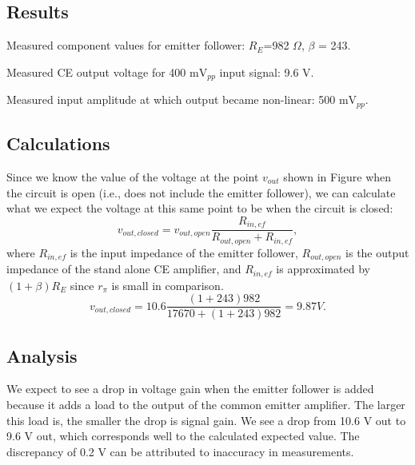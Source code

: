 \documentclass[12pt,letterpaper]{report}
\begin{document}

\subsection*{Results}

Measured component values for emitter follower:
$R_{E}$=982 $\Omega$,
$\beta$ = 243.

Measured CE output voltage for 400 m$\text{V}_{pp}$ input signal: 9.6 V.

Measured input amplitude at which output became non-linear: 500 m$\text{V}_{pp}$.

\subsection*{Calculations}

Since we know the value of the voltage at the point $v_{out}$ shown in Figure %
when the circuit is open (i.e., does not include the emitter follower), we can calculate what we expect the voltage at this same point to be when the circuit is closed:
$$
v_{out,closed} = v_{out,open}\frac{R_{in,ef}}{R_{out,open}+R_{in,ef}},
$$
where $R_{in,ef}$ is the input impedance of the emitter follower, $R_{out,open}$ is the output impedance of the stand alone CE amplifier, and $R_{in,ef}$ is approximated by $(1+\beta)R_E$ since $r_{\pi}$ is small in comparison.
$$
v_{out,closed} = 10.6 \frac{(1+243)982}{17670+(1+243)982} = 9.87 V.
$$


\subsection*{Analysis}

We expect to see a drop in voltage gain when the emitter follower is added because it adds a load to the output of the common emitter amplifier. The larger this load is, the smaller the drop is signal gain. We see a drop from 10.6 V out to 9.6 V out, which corresponds well to the calculated expected value. The discrepancy of 0.2 V can be attributed to inaccuracy in measurements.
\end{document}
